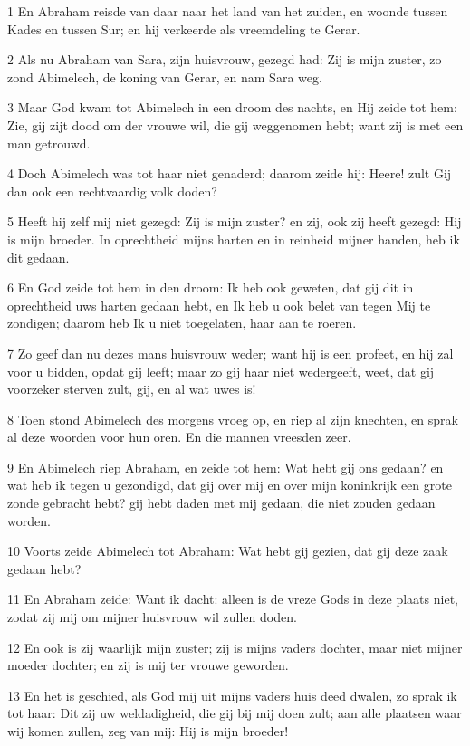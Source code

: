 \par 1 En Abraham reisde van daar naar het land van het zuiden, en woonde tussen Kades en tussen Sur; en hij verkeerde als vreemdeling te Gerar.
\par 2 Als nu Abraham van Sara, zijn huisvrouw, gezegd had: Zij is mijn zuster, zo zond Abimelech, de koning van Gerar, en nam Sara weg.
\par 3 Maar God kwam tot Abimelech in een droom des nachts, en Hij zeide tot hem: Zie, gij zijt dood om der vrouwe wil, die gij weggenomen hebt; want zij is met een man getrouwd.
\par 4 Doch Abimelech was tot haar niet genaderd; daarom zeide hij: Heere! zult Gij dan ook een rechtvaardig volk doden?
\par 5 Heeft hij zelf mij niet gezegd: Zij is mijn zuster? en zij, ook zij heeft gezegd: Hij is mijn broeder. In oprechtheid mijns harten en in reinheid mijner handen, heb ik dit gedaan.
\par 6 En God zeide tot hem in den droom: Ik heb ook geweten, dat gij dit in oprechtheid uws harten gedaan hebt, en Ik heb u ook belet van tegen Mij te zondigen; daarom heb Ik u niet toegelaten, haar aan te roeren.
\par 7 Zo geef dan nu dezes mans huisvrouw weder; want hij is een profeet, en hij zal voor u bidden, opdat gij leeft; maar zo gij haar niet wedergeeft, weet, dat gij voorzeker sterven zult, gij, en al wat uwes is!
\par 8 Toen stond Abimelech des morgens vroeg op, en riep al zijn knechten, en sprak al deze woorden voor hun oren. En die mannen vreesden zeer.
\par 9 En Abimelech riep Abraham, en zeide tot hem: Wat hebt gij ons gedaan? en wat heb ik tegen u gezondigd, dat gij over mij en over mijn koninkrijk een grote zonde gebracht hebt? gij hebt daden met mij gedaan, die niet zouden gedaan worden.
\par 10 Voorts zeide Abimelech tot Abraham: Wat hebt gij gezien, dat gij deze zaak gedaan hebt?
\par 11 En Abraham zeide: Want ik dacht: alleen is de vreze Gods in deze plaats niet, zodat zij mij om mijner huisvrouw wil zullen doden.
\par 12 En ook is zij waarlijk mijn zuster; zij is mijns vaders dochter, maar niet mijner moeder dochter; en zij is mij ter vrouwe geworden.
\par 13 En het is geschied, als God mij uit mijns vaders huis deed dwalen, zo sprak ik tot haar: Dit zij uw weldadigheid, die gij bij mij doen zult; aan alle plaatsen waar wij komen zullen, zeg van mij: Hij is mijn broeder!
